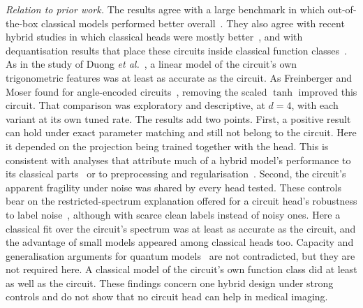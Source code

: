 \documentclass{ieeeaccess}
\begin{document}
\emph{Relation to prior work.} The results agree with a large benchmark in which out-of-the-box classical models performed better overall~\cite{bowles2024}. They also agree with recent hybrid studies in which classical heads were mostly better~\cite{freinberger2026,fulton2026,duong2026}, and with dequantisation results that place these circuits inside classical function classes~\cite{schuld2021,landman2023,sweke2025,schreiber2023}. As in the study of Duong \emph{et al.}~\cite{duong2026}, a linear model of the circuit's own trigonometric features was at least as accurate as the circuit. As Freinberger and Moser found for angle-encoded circuits~\cite{freinberger2026}, removing the scaled $\tanh$ improved this circuit. That comparison was exploratory and descriptive, at $d=4$, with each variant at its own tuned rate. The results add two points. First, a positive result can hold under exact parameter matching and still not belong to the circuit. Here it depended on the projection being trained together with the head. This is consistent with analyses that attribute much of a hybrid model's performance to its classical parts~\cite{kolle2024} or to preprocessing and regularisation~\cite{gillani2026}. Second, the circuit's apparent fragility under noise was shared by every head tested. These controls bear on the restricted-spectrum explanation offered for a circuit head's robustness to label noise~\cite{epa2026}, although with scarce clean labels instead of noisy ones. Here a classical fit over the circuit's spectrum was at least as accurate as the circuit, and the advantage of small models appeared among classical heads too. Capacity and generalisation arguments for quantum models~\cite{abbas2021,caro2022} are not contradicted, but they are not required here. A classical model of the circuit's own function class did at least as well as the circuit. These findings concern one hybrid design under strong controls and do not show that no circuit head can help in medical imaging.
\end{document}
